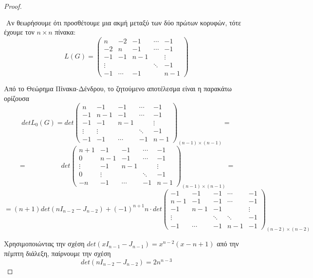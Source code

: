 \documentclass[oneside,a4paper]{article}
\begin{document}
\vspace*{1cm}
\begin{proof} $ $

	$ $\newline
	Αν θεωρήσουμε ότι προσθέτουμε μια ακμή μεταξύ των δύο πρώτων κορυφών, τότε έχουμε τον $n \times n$ πίνακα:
	$$L(G)= \begin{pmatrix}
		n & -2 & -1 & \cdots & -1 \\
		-2 & n & -1 & \cdots & -1 \\
		-1 & -1 & n-1 & & \vdots \\
		\vdots & & & \ddots & -1\\
		-1 & \cdots & -1 & & n-1
	\end{pmatrix}$$

	$ $\newline Από το Θεώρημα Πίνακα-Δένδρου, το ζητούμενο αποτέλεσμα είναι η παρακάτω ορίζουσα
	$$detL_0(G) = det\begin{pmatrix}
		n & -1 & -1 & \cdots & -1 \\
		-1 & n-1 & -1 &  \cdots & -1 \\
		-1 &  -1 & n-1  &  & \vdots \\
		\vdots & \vdots & & \ddots & -1 \\
		-1 & -1 & \cdots & -1 & n-1
	\end{pmatrix}_{(n-1)\times(n-1)} = $$
	$$= \quad \quad \quad \quad \quad det \begin{pmatrix}
		n+1 & -1 & -1 & \cdots & -1 \\
		0& n-1 & -1 &  \cdots & -1 \\
		\vdots &  -1 & n-1  &  & \vdots \\
		0 & \vdots & & \ddots & -1 \\
		-n & -1 & \cdots & -1 & n-1
	\end{pmatrix}_{(n-1)\times(n-1)} =  $$
	$$ = (n+1)det(nI_{n-2} - J_{n-2}) + (-1)^{n+1} n \cdot det \begin{pmatrix}
		-1 & -1 & -1 & \cdots & -1 \\
		n-1& -1 & -1 &  \cdots & -1 \\
		-1 &  n-1 & -1  &  & \vdots \\
		 \vdots &  & \ddots & \ddots & -1 \\
		-1 & \cdots  & -1 & n-1 & -1
	\end{pmatrix}_{(n-2)\times(n-2)}$$


	$ $\newline Χρησιμοποιώντας την σχέση $det(x I_{n-1} - J_{n-1}) = x^{n-2}(x-n+1)$ από την πέμπτη διάλεξη, παίρνουμε την σχέση
	$$det(nI_{n-2}-J_{n-2}) = 2n^{n-3}$$


\end{proof}
\end{document}
